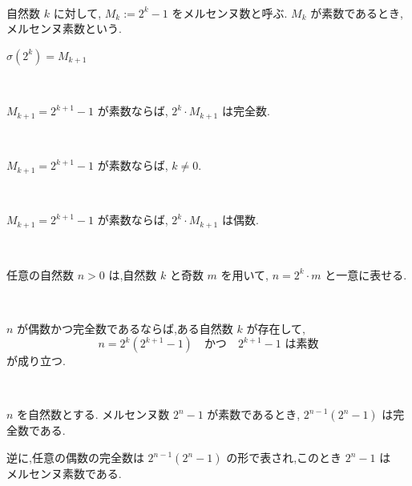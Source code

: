 \begin{definition}[メルセンヌ数]\label{mersenne}\leanok~\

自然数 \(k\) に対して, \(M_k := 2^k - 1\) をメルセンヌ数と呼ぶ. \(M_k\) が素数であるとき,メルセンヌ素数という.

\end{definition}


\begin{lemma}\label{sigma_two_pow_eq_mersenne_succ}\leanok

\(\sigma(2^k) = M_{k+1}\)

\end{lemma}


\begin{theorem}[Euclid I]\label{perfect_two_pow_mul_mersenne_of_prime}
  \leanok~\

\(M_{k+1} = 2^{k+1} - 1\) が素数ならば, \(2^k \cdot M_{k+1}\) は完全数.

\end{theorem}


\begin{lemma}\label{ne_zero_of_prime_mersenne}\leanok~\

\(M_{k+1} = 2^{k+1} - 1\) が素数ならば, \(k \neq 0\).

\end{lemma}


\begin{theorem}\label{even_two_pow_mul_mersenne_of_prime}
\leanok~\

\(M_{k+1} = 2^{k+1} - 1\) が素数ならば, \(2^k \cdot M_{k+1}\) は偶数.

\end{theorem}


\begin{lemma}\label{eq_two_pow_mul_odd}\leanok~\

任意の自然数 \(n > 0\) は,自然数 \(k\) と奇数 \(m\) を用いて, \(n = 2^k \cdot m\) と一意に表せる.

\end{lemma}


\begin{theorem}[Euler]\label{eq_two_pow_mul_prime_mersenne_of_even_perfect}
\leanok~\

\(n\) が偶数かつ完全数であるならば,ある自然数 \(k\) が存在して,
\[
n = 2^k (2^{k+1} - 1)
\quad \text{かつ} \quad
2^{k+1} - 1 \text{ は素数}
\]
が成り立つ.

\end{theorem}


\begin{theorem}\label{even_and_perfect_iff}
\leanok~\

\( n \) を自然数とする.
メルセンヌ数 \( 2^n - 1 \) が素数であるとき, \( 2^{n-1}(2^n - 1) \) は完全数である.

逆に,任意の偶数の完全数は \( 2^{n-1}(2^n - 1) \) の形で表され,このとき \( 2^n - 1 \) は\(メルセンヌ\)素数である.

\end{theorem}
